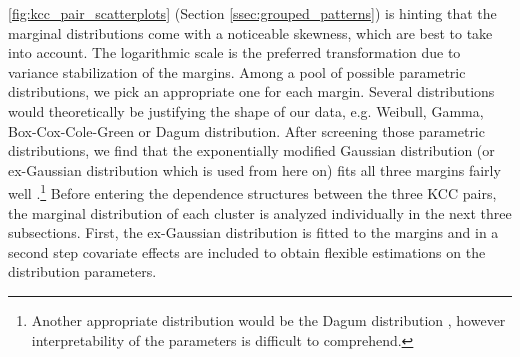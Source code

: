 
\autoref{fig:kcc_pair_scatterplots} (Section \ref{ssec:grouped_patterns}) is hinting that the marginal distributions come with a noticeable skewness, which are best to take into account. The logarithmic scale is the preferred transformation due to variance stabilization of the margins. Among a pool of possible parametric distributions, we pick an appropriate one for each margin. Several distributions would theoretically be justifying the shape of our data, e.g. Weibull, Gamma, Box-Cox-Cole-Green or Dagum distribution. After screening those parametric distributions, we find that the exponentially modified Gaussian distribution (or ex-Gaussian distribution which is used from here on) fits all three margins fairly well \citep{grushka1972characterization}.\footnote{Another appropriate distribution would be the Dagum distribution \citep{dagum1975model}, however interpretability of the parameters is difficult to comprehend.} 
Before entering the dependence structures between the three \ac{KCC} pairs, the marginal distribution of each cluster is analyzed individually in the next three subsections. First, the ex-Gaussian distribution is fitted to the margins and in a second step covariate effects are included to obtain flexible estimations on the distribution parameters.







